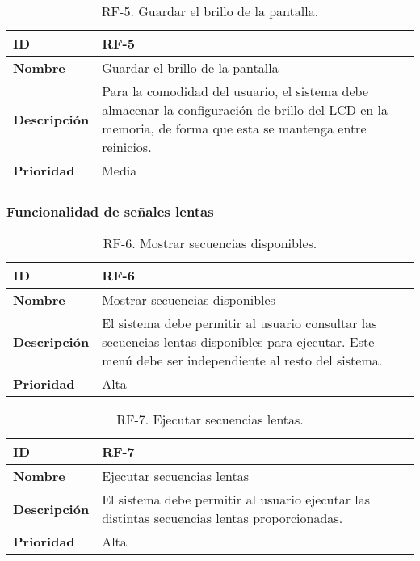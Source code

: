 \begin{table}[h!]
    \centering
    \begin{tabular}{|m{2.5cm}|m{9.27cm}|}
        \hline
        \textbf{ID} & RF-5 \\
        \hline
        \textbf{Nombre} & Guardar el brillo de la pantalla \\
        \hline
        \textbf{Descripción} & Para la comodidad del usuario, el sistema debe almacenar la configuración de brillo del LCD en la memoria, de forma que esta se mantenga entre reinicios. \\
        \hline
        \textbf{Prioridad} & Media \\
        \hline
    \end{tabular}
    \caption{RF-5. Guardar el brillo de la pantalla.}
\end{table}

\subsubsection{Funcionalidad de señales lentas}

\begin{table}[h!]
    \centering
    \begin{tabular}{|m{2.5cm}|m{9.27cm}|}
        \hline
        \textbf{ID} & RF-6 \\
        \hline
        \textbf{Nombre} & Mostrar secuencias disponibles \\
        \hline
        \textbf{Descripción} & El sistema debe permitir al usuario consultar las secuencias lentas disponibles para ejecutar. Este menú debe ser independiente al resto del sistema. \\
        \hline
        \textbf{Prioridad} & Alta \\
        \hline
    \end{tabular}
    \caption{RF-6. Mostrar secuencias disponibles.}
\end{table}

\begin{table}[h!]
    \centering
    \begin{tabular}{|m{2.5cm}|m{9.27cm}|}
        \hline
        \textbf{ID} & RF-7 \\
        \hline
        \textbf{Nombre} & Ejecutar secuencias lentas \\
        \hline
        \textbf{Descripción} & El sistema debe permitir al usuario ejecutar las distintas secuencias lentas proporcionadas. \\
        \hline
        \textbf{Prioridad} & Alta \\
        \hline
    \end{tabular}
    \caption{RF-7. Ejecutar secuencias lentas.}
\end{table}

